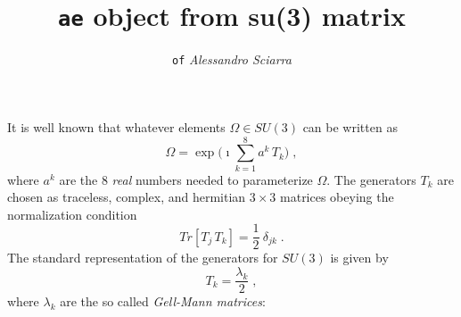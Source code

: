 \documentclass[a4paper,10pt]{article}
\title{\vspace*{-2cm}\huge{\textbf{\texttt{ae} object from su(3) matrix}}\vspace{-0.2cm}}
\author{\texttt{of} \emph{Alessandro Sciarra}}
\date{}
\begin{document}
\maketitle

It is well known that whatever elements $\Omega\in SU(3)$ can be written as
\begin{equation}\label{eq:1}
 \Omega=\exp\Biggl(\imath\sum_{k=1}^8 a^k\, T_k\Biggr)\;,
\end{equation}
where $a^k$ are the 8 \emph{real} numbers needed to parameterize $\Omega$.
The generators $T_k$ are chosen as traceless, complex, and hermitian $3\times3$
matrices obeying the normalization condition
\begin{equation}\label{eq:2}
 Tr[T_j\,T_k]=\frac{1}{2}\:\delta_{jk}\;.
\end{equation}
The standard representation of the generators for $SU(3)$ is given by
\begin{equation}\label{eq:3}
 T_k=\frac{\lambda_k}{2}\;,
\end{equation}
where $\lambda_k$ are the so called \emph{Gell-Mann matrices}:
\end{document}
